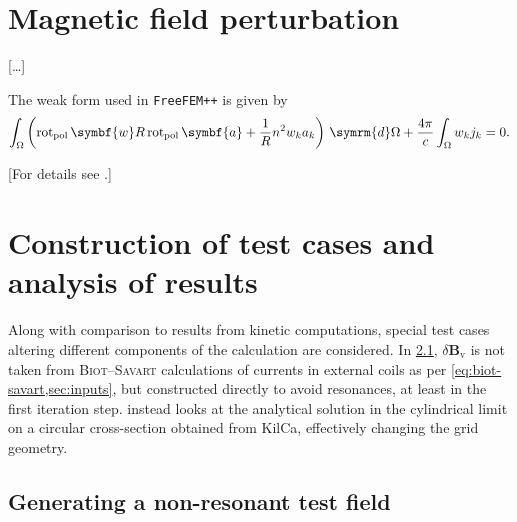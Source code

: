 \documentclass[a4paper, twoside, 10pt, english]{article}
\numberwithin{equation}{section}
\let\vec\symbf
\newcommand*\diff{\ensuremath{\symrm{d}}}  %
\newcommand*\pol{\ensuremath{\textrm{pol}}}  %
\newcommand*\polCurl{\ensuremath{\operatorname{rot}_{\pol}}}  %
\newcommand*\Bvac{\ensuremath{\delta \vec{B}_{\text{v}}}}  %
\begin{document}
\clearpage
\section{Magnetic field perturbation}
\label{sec:compute_Bn}

[\ldots]

The weak form used in \texttt{FreeFEM++} is given by  %
\begin{gather}
  \int_{\Omega} \left ( \polCurl \vec{w} R \polCurl \vec{a} + \frac{1}{R} n^{2} w_{k} a_{k} \right ) \, \diff \Omega + \frac{4 \pi}{c} \int_{\Omega} w_{k} j_{k} = 0.
\end{gather}

[For details see \cite{Albert19,Biro15,Hecht12,Jin02}.]

\clearpage
\section{Construction of test cases and analysis of results}

Along with comparison to results from kinetic computations, special test cases altering different components of the calculation are considered. In \cref{sec:nonres}, $\Bvac$ is not taken from \textsc{Biot}--\textsc{Savart} calculations of currents in external coils as per \cref{eq:biot-savart,sec:inputs}, but constructed directly to avoid resonances, at least in the first iteration step.  instead looks at the analytical solution in the cylindrical limit on a circular cross-section obtained from KilCa, effectively changing the grid geometry.

\subsection{Generating a non-resonant test field}
\label{sec:nonres}
\end{document}
